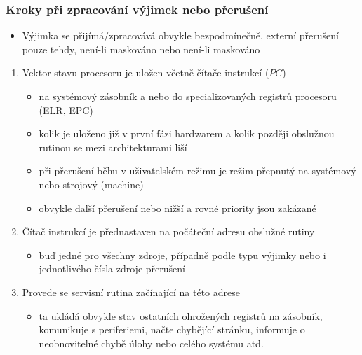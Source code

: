 \documentclass{beamer}
\begin{document}
\begin{frame}
\frametitle{Kroky při zpracování výjimek nebo přerušení}

\begin{itemize}
 \item Výjimka se přijímá/zpracovává obvykle bezpodmínečně,
externí přerušení pouze tehdy, není-li maskováno nebo není-li maskováno
\end{itemize}

\begin{enumerate}
 \item Vektor stavu procesoru je uložen včetně čítače instrukcí ($PC$)
 \begin{itemize}
  \item na systémový zásobník a nebo do specializovaných registrů procesoru (ELR, EPC)
  \item kolik je uloženo již v první fázi hardwarem a kolik později obslužnou rutinou se mezi architekturami liší
  \item při přerušení běhu v uživatelském režimu je režim přepnutý na systémový nebo strojový (machine)
  \item obvykle další přerušení nebo nižší a rovné priority jsou zakázané
 \end{itemize}
 \item Čítač instrukcí je přednastaven na počáteční adresu obslužné rutiny
 \begin{itemize}
  \item buď jedné pro všechny zdroje, případně podle typu výjimky nebo i jednotlivého čísla zdroje přerušení
 \end{itemize}
 \item Provede se servisní rutina začínající na této adrese
 \begin{itemize}
  \item ta ukládá obvykle stav ostatních ohrožených registrů na zásobník, komunikuje s periferiemi,
        načte chybějící stránku, informuje o neobnovitelné chybě úlohy nebo celého systému atd.
 \end{itemize}
\end{enumerate}
\end{frame}
\end{document}
